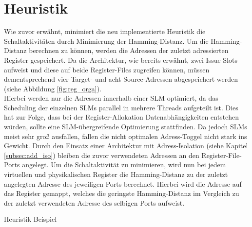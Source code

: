 \section{Heuristik}
\label{sec:Heuristik}
Wie zuvor erwähnt, minimiert die neu implementierte Heuristik die Schaltaktivitäten durch Minimierung der Hamming-Distanz. Um die Hamming-Distanz berechnen zu können, werden die Adressen der zuletzt adressierten Register gespeichert. Da die Architektur, wie bereits erwähnt, zwei Issue-Slots aufweist und diese auf beide Register-Files zugreifen können, müssen dementsprechend vier Target- und acht Source-Adressen abgespeichert werden (siehe Abbildung \ref{fig:reg_orga}).\\
Hierbei werden nur die Adressen innerhalb einer SLM optimiert, da das Scheduling der einzelnen SLMs parallel in mehrere Threads aufgeteilt ist. Dies hat zur Folge, dass bei der Register-Allokation Datenabhängigkeiten entstehen würden, sollte eine SLM-übergreifende Optimierung stattfinden. Da jedoch SLMs meist sehr groß ausfallen, fallen die nicht optimalen Adress-Toggel nicht stark ins Gewicht. 
Durch den Einsatz einer Architektur mit Adress-Isolation (siehe Kapitel \ref{subsec:add_iso}) bleiben die zuvor verwendeten Adressen an den Register-File-Ports angelegt. Um die Schaltaktivität zu minimieren, wird nun bei jedem virtuellen und physikalischen Register die Hamming-Distanz zu der zuletzt angelegten Adresse des jeweiligen Ports berechnet. Hierbei wird die Adresse auf das Register gemappt, welches die geringste Hamming-Distanz im Vergleich zu der zuletzt verwendeten Adresse des selbigen Ports aufweist.\\

\begin{algorithm}[H]
	\begin{algorithmic}[1]
		\caption{Heuristik Beispiel}
		\label{code:heuristik}
\end{algorithmic}
\end{algorithm}

